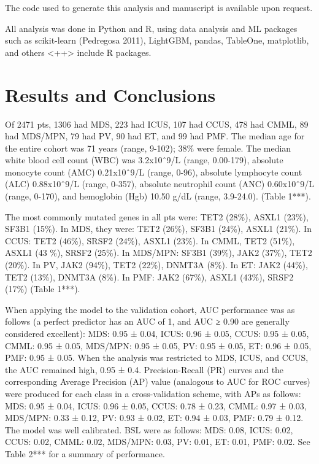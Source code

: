 \documentclass[
]{article}
\begin{document}
The code used to generate this analysis and manuscript is available upon
request.

All analysis was done in Python and R, using data analysis and ML
packages such as scikit-learn (Pedregosa 2011), LightGBM, pandas,
TableOne, matplotlib, and others \textless++\textgreater{} include R
packages.

\hypertarget{results-and-conclusions}{%
\section{Results and Conclusions}\label{results-and-conclusions}}

Of 2471 pts, 1306 had MDS, 223 had ICUS, 107 had CCUS, 478 had CMML, 89
had MDS/MPN, 79 had PV, 90 had ET, and 99 had PMF. The median age for
the entire cohort was 71 years (range, 9-102); 38\% were female. The
median white blood cell count (WBC) was 3.2x10ˆ9/L (range, 0.00-179),
absolute monocyte count (AMC) 0.21x10ˆ9/L (range, 0-96), absolute
lymphocyte count (ALC) 0.88x10ˆ9/L (range, 0-357), absolute neutrophil
count (ANC) 0.60x10ˆ9/L (range, 0-170), and hemoglobin (Hgb) 10.50 g/dL
(range, 3.9-24.0). (Table 1***).

The most commonly mutated genes in all pts were: TET2 (28\%), ASXL1
(23\%), SF3B1 (15\%). In MDS, they were: TET2 (26\%), SF3B1 (24\%),
ASXL1 (21\%). In CCUS: TET2 (46\%), SRSF2 (24\%), ASXL1 (23\%). In CMML,
TET2 (51\%), ASXL1 (43 \%), SRSF2 (25\%). In MDS/MPN: SF3B1 (39\%), JAK2
(37\%), TET2 (20\%). In PV, JAK2 (94\%), TET2 (22\%), DNMT3A (8\%). In
ET: JAK2 (44\%), TET2 (13\%), DNMT3A (8\%). In PMF: JAK2 (67\%), ASXL1
(43\%), SRSF2 (17\%) (Table 1***).

When applying the model to the validation cohort, AUC performance was as
follows (a perfect predictor has an AUC of 1, and AUC ≥ 0.90 are
generally considered excellent): MDS: 0.95 ± 0.04, ICUS: 0.96 ± 0.05,
CCUS: 0.95 ± 0.05, CMML: 0.95 ± 0.05, MDS/MPN: 0.95 ± 0.05, PV: 0.95 ±
0.05, ET: 0.96 ± 0.05, PMF: 0.95 ± 0.05. When the analysis was
restricted to MDS, ICUS, and CCUS, the AUC remained high, 0.95 ± 0.4.
Precision-Recall (PR) curves and the corresponding Average Precision
(AP) value (analogous to AUC for ROC curves) were produced for each
class in a cross-validation scheme, with APs as follows: MDS: 0.95 ±
0.04, ICUS: 0.96 ± 0.05, CCUS: 0.78 ± 0.23, CMML: 0.97 ± 0.03, MDS/MPN:
0.33 ± 0.12, PV: 0.93 ± 0.02, ET: 0.94 ± 0.03, PMF: 0.79 ± 0.12. The
model was well calibrated. BSL were as follows: MDS: 0.08, ICUS: 0.02,
CCUS: 0.02, CMML: 0.02, MDS/MPN: 0.03, PV: 0.01, ET: 0.01, PMF: 0.02.
See Table 2*** for a summary of performance.
\end{document}
